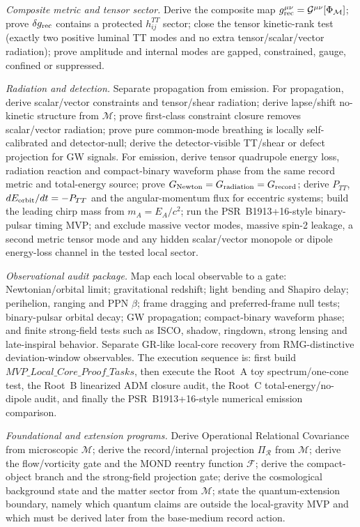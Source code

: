 \documentclass[11pt]{article}
\begin{document}
\medskip\noindent\textit{Composite metric and tensor sector.}
Derive the composite map $g_{\rm rec}^{\mu\nu}=\mathcal G^{\mu\nu}[\Phi_{\mathcal M}]$;
prove $\delta g_{\rm rec}$ contains a protected $h_{ij}^{TT}$ sector; close the
tensor kinetic-rank test (exactly two positive luminal TT modes and no extra
tensor/scalar/vector radiation); prove amplitude and internal modes are
gapped, constrained, gauge, confined or suppressed.

\medskip\noindent\textit{Radiation and detection.}
Separate propagation from emission.  For propagation, derive scalar/vector
constraints and tensor/shear radiation; derive lapse/shift no-kinetic
structure from $\mathcal M$; prove first-class constraint closure removes
scalar/vector radiation; prove pure common-mode breathing is locally
self-calibrated and detector-null; derive the detector-visible TT/shear or
defect projection for GW signals.  For emission, derive tensor quadrupole
energy loss, radiation reaction and compact-binary waveform phase from the
same record metric and total-energy source; prove
$G_{\rm Newton}=G_{\rm radiation}=G_{\rm record}$; derive
$P_{TT}$, $dE_{\rm orbit}/dt=-P_{TT}$ and the angular-momentum flux for
eccentric systems; build the leading chirp mass from $m_A=E_A/c^2$; run the
PSR~B1913+16-style binary-pulsar timing MVP; and exclude massive vector modes,
massive spin-2 leakage, a second metric tensor mode and any hidden
scalar/vector monopole or dipole energy-loss channel in the tested local
sector.

\medskip\noindent\textit{Observational audit package.}
Map each local observable to a gate: Newtonian/orbital limit; gravitational
redshift; light bending and Shapiro delay; perihelion, ranging and PPN
\(\beta\); frame dragging and preferred-frame null tests; binary-pulsar
orbital decay; GW propagation; compact-binary waveform phase; and finite
strong-field tests such as ISCO, shadow, ringdown, strong lensing and
late-inspiral behavior.  Separate GR-like local-core recovery from
RMG-distinctive deviation-window observables.  The execution sequence is:
first build \(MVP\_Local\_Core\_Proof\_Tasks\), then execute the Root~A toy
spectrum/one-cone test, the Root~B linearized ADM closure audit, the Root~C
total-energy/no-dipole audit, and finally the PSR~B1913+16-style numerical
emission comparison.

\medskip\noindent\textit{Foundational and extension programs.}
Derive Operational Relational Covariance from microscopic $\mathcal M$; derive
the record/internal projection $\Pi_{\mathcal R}$ from $\mathcal M$; derive
the flow/vorticity gate and the MOND reentry function $\mathcal F$; derive
the compact-object branch and the strong-field projection gate; derive the
cosmological background state and the matter sector from $\mathcal M$; state
the quantum-extension boundary, namely which quantum claims are outside the
local-gravity MVP and which must be derived later from the base-medium record
action.
\end{document}
